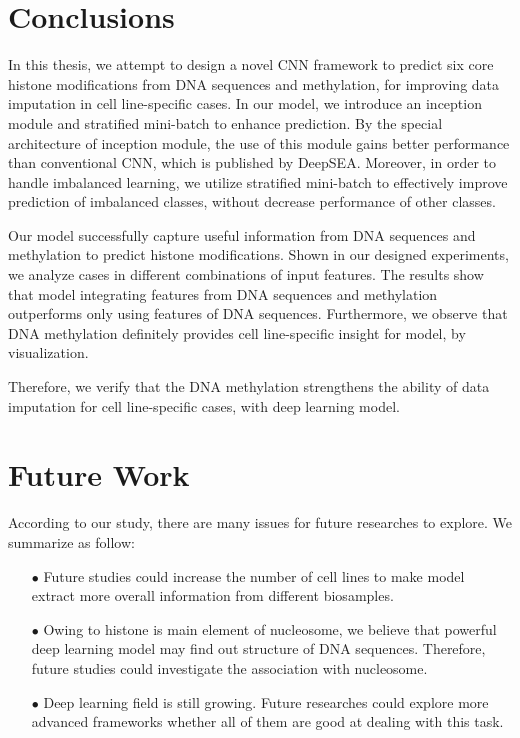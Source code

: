 \hspace{24pt}

\section{Conclusions}
In this thesis, we attempt to design a novel CNN framework to predict six core histone modifications from DNA sequences and methylation, for improving data imputation in cell line-specific cases. In our model, we introduce an inception module and stratified mini-batch to enhance prediction. By the special architecture of inception module, the use of this module gains better performance than conventional CNN, which is published by DeepSEA. Moreover, in order to handle imbalanced learning, we utilize stratified mini-batch to effectively improve prediction of imbalanced classes, without decrease performance of other classes.

Our model successfully capture useful information from DNA sequences and methylation to predict histone modifications. Shown in our designed experiments, we analyze cases in different combinations of input features. The results show that model integrating features from DNA sequences and methylation outperforms only using features of DNA sequences. Furthermore, we observe that DNA methylation definitely provides cell line-specific insight for model, by visualization.

Therefore, we verify that the DNA methylation strengthens the ability of data imputation for cell line-specific cases, with deep learning model.

\section{Future Work}
According to our study, there are many issues for future researches to explore. We summarize as follow:

\begin{itemize}
\item[$\bullet$] Future studies could increase the number of cell lines to make model extract more overall information from different biosamples.
\item[$\bullet$] Owing to histone is main element of nucleosome, we believe that powerful deep learning model may find out structure of DNA sequences. Therefore, future studies could investigate the association with nucleosome.
\item[$\bullet$] Deep learning field is still growing. Future researches could explore more advanced frameworks whether all of them are good at dealing with this task.
\end{itemize}

